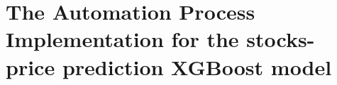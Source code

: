 \documentclass[conference]{IEEEtran}
\begin{document}





\section{The Automation Process Implementation for the 
         stocks-price prediction XGBoost model}

\setlength{\fboxrule}{2pt}
    	\\


        	
\end{document}
